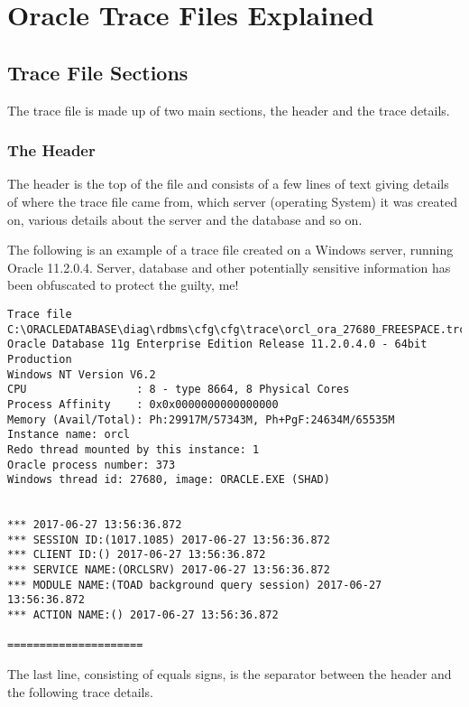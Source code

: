 \chapter{Oracle Trace Files Explained}\label{oracle-trace-files-explained}

\section{Trace File Sections}\label{trace-file-sections}

The trace file is made up of two main sections, the header and the trace details.

\subsection{The Header}\label{the-header}

The header is the top of the file and consists of a few lines of text giving details of where the trace file came from, which server (operating System) it was created on, various details about the server and the database and so on.

The following is an example of a trace file created on a Windows server, running Oracle 11.2.0.4. Server, database and other potentially sensitive information has been obfuscated to protect the guilty, me!

\begin{lstlisting}[numbers=none,caption={Oracle 11g Trace File Header}]
Trace file C:\ORACLEDATABASE\diag\rdbms\cfg\cfg\trace\orcl_ora_27680_FREESPACE.trc
Oracle Database 11g Enterprise Edition Release 11.2.0.4.0 - 64bit Production
Windows NT Version V6.2  
CPU                 : 8 - type 8664, 8 Physical Cores
Process Affinity    : 0x0x0000000000000000
Memory (Avail/Total): Ph:29917M/57343M, Ph+PgF:24634M/65535M 
Instance name: orcl
Redo thread mounted by this instance: 1
Oracle process number: 373
Windows thread id: 27680, image: ORACLE.EXE (SHAD)


*** 2017-06-27 13:56:36.872
*** SESSION ID:(1017.1085) 2017-06-27 13:56:36.872
*** CLIENT ID:() 2017-06-27 13:56:36.872
*** SERVICE NAME:(ORCLSRV) 2017-06-27 13:56:36.872
*** MODULE NAME:(TOAD background query session) 2017-06-27 13:56:36.872
*** ACTION NAME:() 2017-06-27 13:56:36.872

=====================
\end{lstlisting}

The last line, consisting of equals signs, is the separator between the header and the following trace details.

